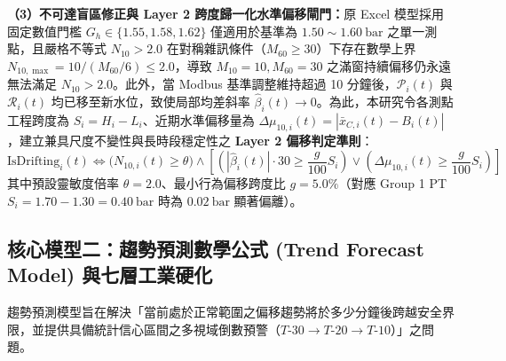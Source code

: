 \documentclass[fontset=none, a4paper, 12pt]{ctexart}
\begin{document}
\begin{doublespace}
\textbf{（3）不可達盲區修正與 Layer 2 跨度歸一化水準偏移閘門：}原 Excel 模型採用固定數值門檻 $G_h \in \{1.55, 1.58, 1.62\}$ 僅適用於基準為 $1.50\sim 1.60\ \mathrm{bar}$ 之單一測點，且嚴格不等式 $N_{10} > 2.0$ 在對稱雜訊條件（$M_{60} \ge 30$）下存在數學上界 $N_{10,\max} = 10 / (M_{60}/6) \le 2.0$，導致 $M_{10}=10, M_{60}=30$ 之滿窗持續偏移仍永遠無法滿足 $N_{10} > 2.0$。此外，當 Modbus 基準調整維持超過 10 分鐘後，$\mathcal{P}_i(t)$ 與 $\mathcal{R}_i(t)$ 均已移至新水位，致使局部均差斜率 $\hat{\beta}_i(t) \to 0$。為此，本研究令各測點工程跨度為 $S_i = H_i - L_i$、近期水準偏移量為 $\Delta \mu_{10,i}(t) = |\bar{x}_{C,i}(t) - B_i(t)|$，建立兼具尺度不變性與長時段穩定性之 \textbf{Layer 2 偏移判定準則}：
\begin{equation}
\mathrm{IsDrifting}_i(t) \iff \bigl(N_{10,i}(t) \ge \theta\bigr) \land \left[\left(|\hat{\beta}_i(t)|\cdot 30 \ge \frac{g}{100}S_i\right) \lor \left(\Delta \mu_{10,i}(t) \ge \frac{g}{100}S_i\right)\right]
\label{eq:drift_gate}
\end{equation}
其中預設靈敏度倍率 $\theta = 2.0$、最小行為偏移跨度比 $g = 5.0\%$（對應 Group 1 PT $S_i = 1.70-1.30 = 0.40\ \mathrm{bar}$ 時為 $0.02\ \mathrm{bar}$ 顯著偏離）。

\subsection{核心模型二：趨勢預測數學公式 (Trend Forecast Model) 與七層工業硬化}
\label{sec:trend_forecast}
趨勢預測模型旨在解決「當前處於正常範圍之偏移趨勢將於多少分鐘後跨越安全界限，並提供具備統計信心區間之多視域倒數預警（$T\text{-}30 \to T\text{-}20 \to T\text{-}10$）」之問題。


\end{doublespace}
\end{document}
